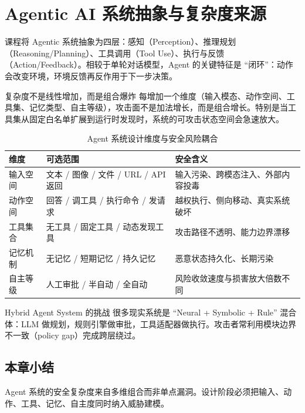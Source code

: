 \section{Agentic AI 系统抽象与复杂度来源}

课程将 Agentic 系统抽象为四层：感知（Perception）、推理规划（Reasoning/Planning）、工具调用（Tool Use）、执行与反馈（Action/Feedback）。相较于单轮对话模型，Agent 的关键特征是 ``闭环''：动作会改变环境，环境反馈再反作用于下一步决策。

\begin{importantbox}{复杂度不是线性增加，而是组合爆炸}
每增加一个维度（输入模态、动作空间、工具集、记忆类型、自主等级），攻击面不是加法增长，而是组合增长。特别是当工具集从固定白名单扩展到运行时发现时，系统的可攻击状态空间会急速放大。
\end{importantbox}

\begin{table}[H]
\centering
\begin{tabular}{p{2.2cm}p{4.2cm}p{4.5cm}}
\toprule
\textbf{维度} & \textbf{可选范围} & \textbf{安全含义} \\
\midrule
输入空间 & 文本 / 图像 / 文件 / URL / API 返回 & 输入污染、跨模态注入、外部内容投毒 \\
动作空间 & 回答 / 调工具 / 执行命令 / 发请求 & 越权执行、侧向移动、真实系统破坏 \\
工具集合 & 无工具 / 固定工具 / 动态发现工具 & 攻击路径不透明、能力边界漂移 \\
记忆机制 & 无记忆 / 短期记忆 / 持久记忆 & 恶意状态持久化、长期污染 \\
自主等级 & 人工审批 / 半自动 / 全自动 & 风险收敛速度与损害放大倍数不同 \\
\bottomrule
\end{tabular}
\caption{Agent 系统设计维度与安全风险耦合}
\end{table}

\begin{knowledgebox}{Hybrid Agent System 的挑战}
很多现实系统是 ``Neural + Symbolic + Rule'' 混合体：LLM 做规划，规则引擎做审批，工具适配器做执行。攻击者常利用模块边界不一致（policy gap）完成跨层绕过。
\end{knowledgebox}

\subsection{本章小结}
Agent 系统的安全复杂度来自多维组合而非单点漏洞。设计阶段必须把输入、动作、工具、记忆、自主度同时纳入威胁建模。

